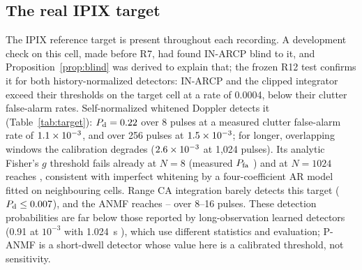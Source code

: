 \documentclass[journal]{IEEEtran}
\begin{document}
\subsection{The real IPIX target}\label{sec:realtarget}
\begin{table}[!t]
\centering\footnotesize
\caption{Real IPIX target (primary cell, test thirds, \NUnitsConf{} units): mean $P_{\rm d}$ at design $P_{\rm fa}=10^{-3}$ versus dwell $N$; in parentheses, measured clutter $P_{\rm fa}$ ($\times10^{-3}$). P-ANMF with Fisher's $g$ uses the analytic threshold.}
\label{tab:target}
\setlength{\tabcolsep}{4pt}

\end{table}
The IPIX reference target is present throughout each recording. A development check on this cell, made before R7, had found IN-ARCP blind to it, and Proposition~\ref{prop:blind} was derived to explain that; the frozen R12 test confirms it for both history-normalized detectors: IN-ARCP and the clipped integrator exceed their thresholds on the target cell at a rate of 0.0004, below their clutter false-alarm rates. Self-normalized whitened Doppler detects it (Table~\ref{tab:target}): $P_{\rm d}=0.22$ over 8 pulses at a measured clutter false-alarm rate of $1.1\times10^{-3}$, and \TPanmfTwoFiveSix{} over 256 pulses at $1.5\times10^{-3}$; for longer, overlapping windows the calibration degrades ($2.6\times10^{-3}$ at 1,024 pulses). Its analytic Fisher's $g$ threshold fails already at $N=8$ (measured $P_{\rm fa}$ \TFisherPfaEight) and at $N=1024$ reaches \TFisherPfaThousand, consistent with imperfect whitening by a four-coefficient AR model fitted on neighbouring cells. Range CA integration barely detects this target ($P_{\rm d}\le0.007$), and the ANMF reaches \TFpEight--\TFpSixteen{} over 8--16 pulses. These detection probabilities are far below those reported by long-observation learned detectors (0.91 at $10^{-3}$ with 1.024~s \cite{qu2023sensors}), which use different statistics and evaluation; P-ANMF is a short-dwell detector whose value here is a calibrated threshold, not sensitivity.
\end{document}
